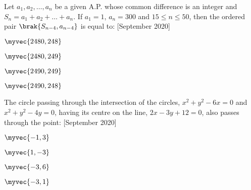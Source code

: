 \item Let $a_1, a_2, \ldots, a_n$ be a given A.P. whose common difference is an integer and $S_n = a_1 + a_2 + \ldots + a_n$. If $a_1 = 1$, $a_n = 300$ and $15 \leq n \leq 50$, then the ordered pair  $\brak{S_{n-4}, a_{n-4}}$ is equal to: \hfill{[September 2020]}

\begin{enumerate}
\begin{multicols}{4}
\item $\myvec{2480,248}$
\item $\myvec{2480,249}$
\item $\myvec{2490,249}$
\item $\myvec{2490,248}$
\end{multicols}
\end{enumerate}

\item The circle passing through the intersection of the circles, $x^2+y^2-6x=0$ and $x^2+y^2-4y=0$, having its centre on the line, $2x-3y+12=0$, also passes through the point: \hfill{[September 2020]}
\begin{enumerate}
\begin{multicols}{4}
\item $\myvec{-1,3}$
\item $\myvec{1,-3}$
\item $\myvec{-3,6}$
\item $\myvec{-3,1}$
\end{multicols}
\end{enumerate}

